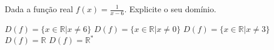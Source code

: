 Dada a função real $f(x)=\frac{1}{x-6}$. Explicite o seu domínio.

$D(f)=\{ x\in \mathbb{R} | x\neq 6 \}$
$D(f)=\{ x\in \mathbb{R} | x\neq 0 \}$
$D(f)=\{ x\in \mathbb{R} | x\neq 3 \}$
$D(f)=\mathbb{R}$
$D(f)=\mathbb{R}^*$




